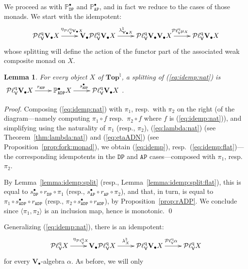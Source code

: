 \documentclass[preprint,12pt]{elsarticle}
\newcommand\Pred{\mathbb{P}}
\newcommand\Angel{{\mathtt{A}}}
\newcommand\Demon{{\mathtt{D}}}
\newcommand\Nature{{\mathtt{P}}}
\newcommand\AN{{\Angel\Nature}}
\newcommand\DN{{\Demon\Nature}}
\newcommand\ADN{{\Angel\Demon\Nature}}
\newcommand\Vt{\mathsf{V}}
\newcommand\quasi{\mathrm{q}} %
\newcommand\QL{\Plotkin^\quasi}
\newcommand\QLV{\QL_\Vt}
\newcommand\Plotkin{\mathcal P\ell} %
\newcommand\Val{{\mathbf V}}
\newcommand\Topcat{\mathbf{Top}}
\newtheorem{lemma}[theorem]{Lemma}
\begin{document}
We proceed as with $\Pred_\DN^\bullet$ and $\Pred_\AN^\bullet$, and in
fact we reduce to the cases of those monads.  We start with the
idempotent:
\begin{equation}
  \label{eq:idemp:nat}
  \xymatrix{
    \QLV {\Val_\bullet X} \ar[r]^{\eta_{\QLV {\Val_\bullet X}}}
    & \Val_\bullet {\QLV {\Val_\bullet X}}
    \ar[r]^{\lambda^\natural_{\Val_\bullet X}}
    & \QLV {\Val_\bullet {\Val_\bullet X}}
    \ar[r]^{\QLV {\mu_X}}
    & \QLV {\Val_\bullet X}
  }
\end{equation}
whose splitting will define the action of the functor part of the
associated weak composite monad on $X$.
\begin{lemma}
  \label{lemma:idemp:split:nat}
  For every object $X$ of $\Topcat^\natural$, a splitting of
  (\ref{eq:idemp:nat}) is
  $\xymatrix{\QLV {\Val_\bullet X} \ar[r]^{r_\ADN} &
    \Pred_\ADN^\bullet X \ar[r]^{s_\ADN^\bullet} & \QLV {\Val_\bullet
      X}}$.
\end{lemma}
\begin{proof}
  Composing (\ref{eq:idemp:nat}) with $\pi_1$, resp.\ with $\pi_2$ on
  the right (of the diagram---namely computing $\pi_1 \circ f$ resp.\
  $\pi_2 \circ f$ where $f$ is (\ref{eq:idemp:nat})), and simplifying
  using the naturality of $\pi_1$ (resp., $\pi_2$),
  (\ref{eq:lambda:nat}) (see Theorem~\ref{thm:lambda:nat}) and
  (\ref{eq:etaADN}) (see Proposition~\ref{prop:fork:monad}), we obtain
  (\ref{eq:idemp}), resp.\ (\ref{eq:idemp:flat})---the corresponding
  idempotents in the $\DN$ and $\AN$ cases---composed with $\pi_1$,
  resp.\ $\pi_2$.

  By Lemma~\ref{lemma:idemp:split} (resp.,
  Lemma~\ref{lemma:idemp:split:flat}), this is equal to
  $s_\DN^\bullet \circ r_\DN \circ \pi_1$ (resp.,
  $s_\AN^\bullet \circ r_\AN \circ \pi_2$), and that, in turn, is
  equal to $\pi_1 \circ s_\ADN^\bullet \circ r_\ADN$ (resp.,
  $\pi_2 \circ s_\ADN^\bullet \circ r_\ADN$), by
  Proposition~\ref{prop:rADP}.  We conclude since
  $\langle \pi_1, \pi_2 \rangle$ is an inclusion map, hence is
  monotonic.  \qed
\end{proof}
Generalizing (\ref{eq:idemp:nat}), there is an idempotent:
\begin{equation}
  \label{eq:idemp:alpha:nat}
  \xymatrix{
    \QLV X \ar[r]^{\eta_{\QLV X}}
    & \Val_\bullet {\QLV X}
    \ar[r]^{\lambda^\natural_X}
    & \QLV {\Val_\bullet X}
    \ar[r]^{\QLV \alpha}
    & \QLV X
  }
\end{equation}
for every $\Val_\bullet$-algebra $\alpha$.  As before, we will only
\end{document}
